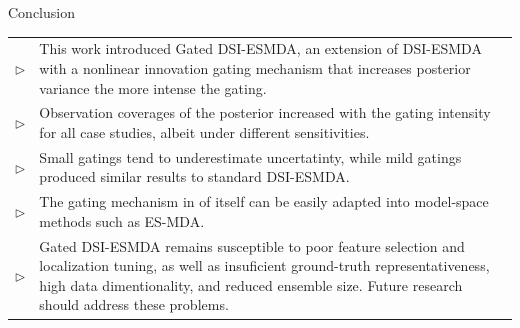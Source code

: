 
\begin{frame}{Conclusion}
    \def\arraystretch{1.5}
    \begin{tabular}{l p{.93\linewidth}}
        $\triangleright$ &
            This work introduced Gated DSI-ESMDA, an extension of DSI-ESMDA 
            with a nonlinear innovation gating mechanism that increases posterior variance 
            the more intense the gating.
    \\
        $\triangleright$ &
            Observation coverages of the posterior increased with the gating intensity for all case studies,
            albeit under different sensitivities.
    \\
        $\triangleright$ &
        Small gatings tend to underestimate uncertatinty, while mild gatings produced similar results to standard DSI-ESMDA.
    \\
        $\triangleright$ &
            The gating mechanism in of itself can be easily adapted into model-space methods such as ES-MDA.
    \\
        $\triangleright$ &
            Gated DSI-ESMDA 
            remains susceptible to poor feature selection and localization tuning,
            as well as insuficient ground-truth representativeness, 
            high data dimentionality, and reduced ensemble size. 
            Future research should address these problems.
    \end{tabular}
\end{frame}